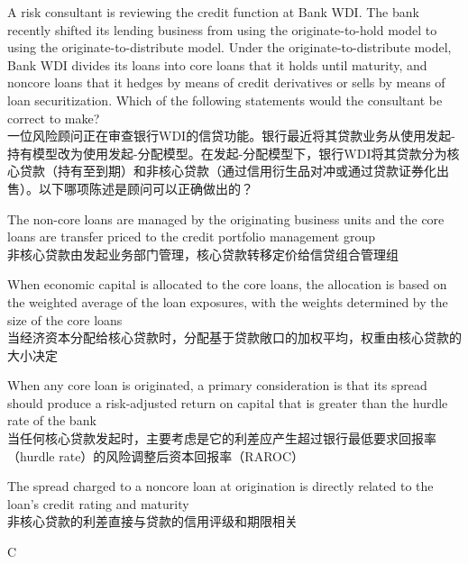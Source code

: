 \documentclass{article}
\newcounter{question} %
\begin{document}
\begin{question}
    A risk consultant is reviewing the credit function at Bank WDI. The bank recently shifted its lending business from using the originate-to-hold model to using the originate-to-distribute model. Under the originate-to-distribute model, Bank WDI divides its loans into core loans that it holds until maturity, and noncore loans that it hedges by means of credit derivatives or sells by means of loan securitization. Which of the following statements would the consultant be correct to make?
    \\一位风险顾问正在审查银行WDI的信贷功能。银行最近将其贷款业务从使用发起-持有模型改为使用发起-分配模型。在发起-分配模型下，银行WDI将其贷款分为核心贷款（持有至到期）和非核心贷款（通过信用衍生品对冲或通过贷款证券化出售）。以下哪项陈述是顾问可以正确做出的？
\end{question}

\begin{choices}
    \item The non-core loans are managed by the originating business units and the core loans are transfer priced to the credit portfolio management group\\
    非核心贷款由发起业务部门管理，核心贷款转移定价给信贷组合管理组
    \item When economic capital is allocated to the core loans, the allocation is based on the weighted average of the loan exposures, with the weights determined by the size of the core loans\\
    当经济资本分配给核心贷款时，分配基于贷款敞口的加权平均，权重由核心贷款的大小决定
    \item When any core loan is originated, a primary consideration is that its spread should produce a risk-adjusted return on capital that is greater than the hurdle rate of the bank\\
    当任何核心贷款发起时，主要考虑是它的利差应产生超过银行最低要求回报率（hurdle rate）的风险调整后资本回报率（RAROC）
    \item The spread charged to a noncore loan at origination is directly related to the loan's credit rating and maturity\\
    非核心贷款的利差直接与贷款的信用评级和期限相关
\end{choices}

\begin{correctanswer}
    C
\end{correctanswer}
\end{document}
